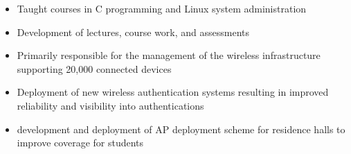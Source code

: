 \documentclass[10pt,letter,ragged2e]{altacv}
\begin{document}
%

\divider

\begin{itemize}
\item Taught courses in C programming and Linux system administration
\item Development of lectures, course work, and assessments
\end{itemize}

\divider


\begin{itemize}
\item Primarily responsible for the management of the wireless infrastructure
    supporting 20,000 connected devices
\item Deployment of new wireless authentication systems resulting in improved
    reliability and visibility into authentications
\item development and deployment of AP deployment scheme for residence halls
    to improve coverage for students
\end{itemize}

%
%
%
\end{document}
